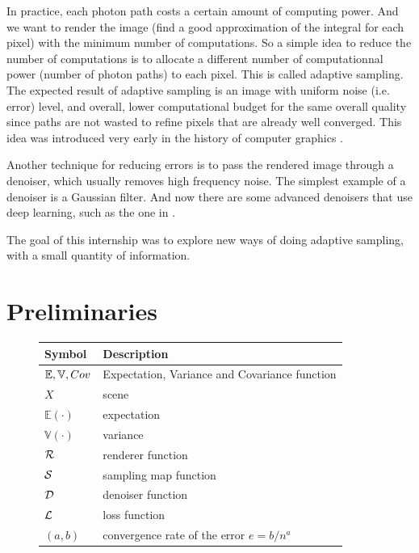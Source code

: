 \documentclass{classeENS}
\begin{document}
\par In practice, each photon path costs a certain amount of computing power. 
And we want to render the image (find a good approximation of the integral 
for each pixel) with the minimum number of computations. So a simple idea 
to reduce the number of computations is to allocate a different number 
of computationnal power (number of photon paths) to each pixel. This is called 
adaptive sampling. The expected result of adaptive sampling is an 
image with uniform noise (i.e. error) level, and overall, 
lower computational budget for the same overall quality 
since paths are not wasted to refine pixels that are 
already well converged. This idea was introduced very early in the 
history of computer graphics \cite{10.1145/325165.325179}. 

\par Another technique for reducing errors is to pass the rendered image 
through a denoiser, which usually removes high frequency noise. The 
simplest example of a denoiser is a Gaussian filter. And now there 
are some advanced denoisers that use deep learning, such as the one 
in \cite{10.1145/3072959.3073708}.  

\par The goal of this internship was to explore new ways of doing adaptive 
sampling, with a small quantity of information.
\section{Preliminaries}

\begin{figure}[H]
    \centering
    \begin{tabular}{C{2cm} L{10cm}}
    \hline  
        Symbol & Description
    \tabularnewline 
    \hline
        $\mathbb E, \mathbb V, Cov$ & Expectation, Variance and Covariance function
    \tabularnewline
        $X$ & scene
    \tabularnewline
        $\mathbb E(\cdot)$ & expectation
    \tabularnewline
        $\mathbb V(\cdot)$ & variance
    \tabularnewline
        $\mathcal R$ & renderer function
    \tabularnewline
        $\mathcal S$ & sampling map function
    \tabularnewline
        $\mathcal D$ & denoiser function
    \tabularnewline
        $\mathcal L$ & loss function
    \tabularnewline
        $(a,b)$ & convergence rate of the error $e = b/n^a$
    \tabularnewline
    \hline 
    \end{tabular}
\end{figure}
\end{document}
